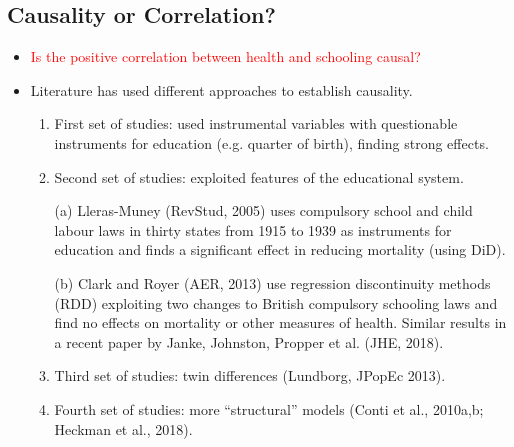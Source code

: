 \subsection{Causality or Correlation?}
\begin{itemize}
        \item \textcolor{red}{Is the positive correlation between health and schooling causal?}
        \item Literature has used different approaches to establish causality.
        \begin{enumerate}
            \item First set of studies: used instrumental variables with questionable instruments for education (e.g. quarter of birth), finding strong effects.
            \item Second set of studies: exploited features of the educational system.
            
            (a) Lleras-Muney (RevStud, 2005) uses compulsory school and child labour laws in thirty states from 1915 to 1939 as instruments for education and finds a significant effect in reducing mortality (using DiD).

            (b) Clark and Royer (AER, 2013) use regression discontinuity methods (RDD) exploiting two changes to British compulsory schooling laws and find no effects on mortality or other measures of health. Similar results in a recent paper by Janke, Johnston, Propper et al. (JHE, 2018).

             \item Third set of studies: twin differences (Lundborg, JPopEc 2013).
             \item Fourth set of studies: more “structural” models (Conti et al., 2010a,b; Heckman et al., 2018).
        \end{enumerate}
\end{itemize} 

